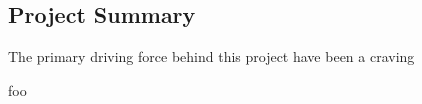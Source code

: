 
\subsection{Project Summary}

The primary driving force behind this project have been a craving



foo
